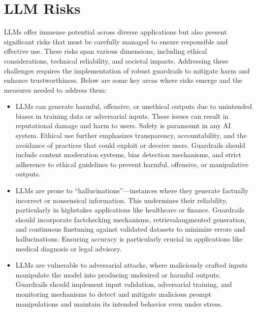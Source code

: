 \documentclass[letterpaper,11pt,english]{sphinxmanual}
\begin{document}
\section{LLM Risks}
\label{\detokenize{guardrails:llm-risks}}
\sphinxAtStartPar
LLMs offer immense potential across diverse applications but also
present significant risks that must be carefully managed to ensure
responsible and effective use. These risks span various dimensions,
including ethical considerations, technical reliability, and societal
impacts. Addressing these challenges requires the implementation of
robust guardrails to mitigate harm and enhance trustworthiness. Below
are some key areas where risks emerge and the measures needed to address
them:
\begin{itemize}
\item {} 
\sphinxAtStartPar
{}

\sphinxAtStartPar
LLMs can generate harmful, offensive, or unethical outputs due to
unintended biases in training data or adversarial inputs. These issues
can result in reputational damage and harm to users. Safety is
paramount in any AI system. Ethical use further emphasizes
transparency, accountability, and the avoidance of practices that
could exploit or deceive users. Guardrails should include content
moderation systems, bias detection mechanisms, and strict adherence to
ethical guidelines to prevent harmful, offensive, or manipulative
outputs.

\item {} 
\sphinxAtStartPar
{}

\sphinxAtStartPar
LLMs are prone to “hallucinations”—instances where they generate
factually incorrect or nonsensical information. This undermines their
reliability, particularly in high\sphinxhyphen{}stakes applications like healthcare
or finance. Guardrails should incorporate fact\sphinxhyphen{}checking mechanisms,
retrieval\sphinxhyphen{}augmented generation, and continuous fine\sphinxhyphen{}tuning against
validated datasets to minimize errors and hallucinations. Ensuring
accuracy is particularly crucial in applications like medical
diagnosis or legal advisory.

\item {} 
\sphinxAtStartPar
{}

\sphinxAtStartPar
LLMs are vulnerable to adversarial attacks, where maliciously crafted
inputs manipulate the model into producing undesired or harmful
outputs. Guardrails should implement input validation, adversarial
training, and monitoring mechanisms to detect and mitigate malicious
prompt manipulations and maintain its intended behavior even under
stress.


\end{itemize}
\end{document}
